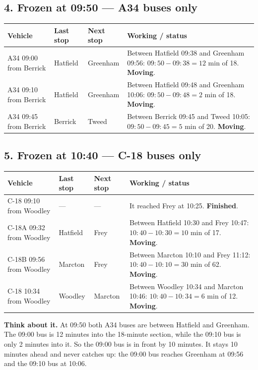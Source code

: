 \documentclass[11pt,a4paper]{article}
\newcommand{\ans}[1]{\textcolor{red!75!black}{\textbf{#1}}}
\begin{document}
\subsection*{4. Frozen at 09:50 --- A34 buses only}
\begin{tabularx}{\linewidth}{@{}l l l X@{}}
\toprule
Vehicle & Last stop & Next stop & Working / status\\
\midrule
A34 09:00 from Berrick & Hatfield & Greenham & Between Hatfield 09:38 and Greenham 09:56: \(09{:}50-09{:}38=12\) min of 18. \ans{Moving}.\\
A34 09:10 from Berrick & Hatfield & Greenham & Between Hatfield 09:48 and Greenham 10:06: \(09{:}50-09{:}48=2\) min of 18. \ans{Moving}.\\
A34 09:45 from Berrick & Berrick & Tweed & Between Berrick 09:45 and Tweed 10:05: \(09{:}50-09{:}45=5\) min of 20. \ans{Moving}.\\
\bottomrule
\end{tabularx}

\subsection*{5. Frozen at 10:40 --- C-18 buses only}
\begin{tabularx}{\linewidth}{@{}l l l X@{}}
\toprule
Vehicle & Last stop & Next stop & Working / status\\
\midrule
C-18 09:10 from Woodley & --- & --- & It reached Frey at 10:25. \ans{Finished}.\\
C-18A 09:32 from Woodley & Hatfield & Frey & Between Hatfield 10:30 and Frey 10:47: \(10{:}40-10{:}30=10\) min of 17. \ans{Moving}.\\
C-18B 09:56 from Woodley & Marcton & Frey & Between Marcton 10:10 and Frey 11:12: \(10{:}40-10{:}10=30\) min of 62. \ans{Moving}.\\
C-18 10:34 from Woodley & Woodley & Marcton & Between Woodley 10:34 and Marcton 10:46: \(10{:}40-10{:}34=6\) min of 12. \ans{Moving}.\\
\bottomrule
\end{tabularx}

\textbf{Think about it.} At 09:50 both A34 buses are between Hatfield and Greenham. The 09:00 bus is 12 minutes into the 18-minute section, while the 09:10 bus is only 2 minutes into it. So the 09:00 bus is in front by 10 minutes. It stays 10 minutes ahead and never catches up: the 09:00 bus reaches Greenham at 09:56 and the 09:10 bus at 10:06.
\end{document}
